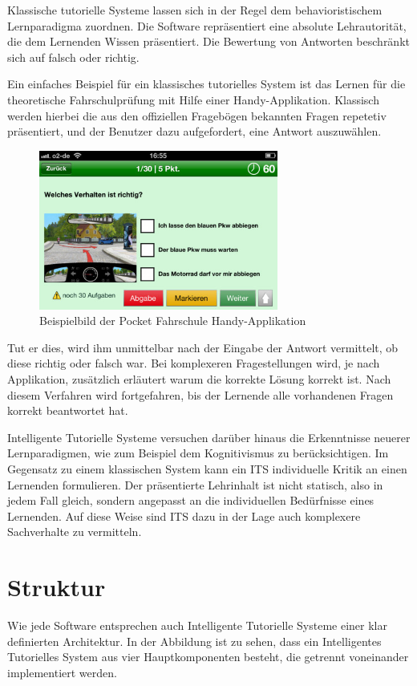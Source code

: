 Klassische tutorielle Systeme lassen sich in der Regel dem behavioristischem Lernparadigma
zuordnen. Die Software repräsentiert eine absolute Lehrautorität, die dem Lernenden
Wissen präsentiert. Die Bewertung von Antworten beschränkt sich auf falsch oder richtig.

Ein einfaches Beispiel für ein klassisches tutorielles System ist das Lernen für
die theoretische Fahrschulprüfung mit Hilfe einer Handy-Applikation. Klassisch werden
hierbei die aus den offiziellen Fragebögen bekannten Fragen repetetiv präsentiert,
und der Benutzer dazu aufgefordert, eine Antwort auszuwählen.

\begin{figure}
	\centering
    \includegraphics[width=0.7\textwidth]{bilder/fahrschule_app.jpg} %
	\caption{Beispielbild der Pocket Fahrschule Handy-Applikation}
\end{figure}

Tut er dies, wird ihm unmittelbar nach der Eingabe der Antwort vermittelt,
ob diese richtig oder falsch war.
Bei komplexeren Fragestellungen wird, je nach Applikation, zusätzlich erläutert warum
die korrekte Lösung korrekt ist.
Nach diesem Verfahren wird fortgefahren, bis der Lernende alle vorhandenen Fragen
korrekt beantwortet hat.

Intelligente Tutorielle Systeme versuchen darüber hinaus die Erkenntnisse neuerer Lernparadigmen,
wie zum Beispiel dem Kognitivismus zu berücksichtigen.
Im Gegensatz zu einem klassischen System kann ein ITS individuelle Kritik an einen Lernenden
formulieren. Der präsentierte Lehrinhalt ist nicht statisch, also in jedem Fall gleich, sondern
angepasst an die individuellen Bedürfnisse eines Lernenden.
Auf diese Weise sind ITS dazu in der Lage auch komplexere Sachverhalte zu vermitteln.

\section{Struktur}
Wie jede Software entsprechen auch Intelligente Tutorielle Systeme einer klar definierten Architektur.
In der Abbildung ist zu sehen, dass ein Intelligentes Tutorielles System aus vier
Hauptkomponenten besteht, die getrennt voneinander implementiert werden.

